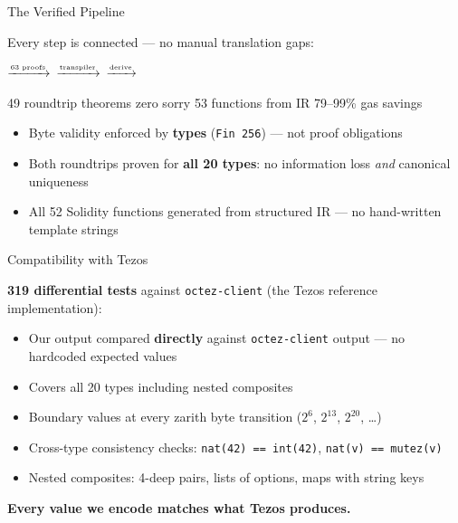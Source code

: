 \documentclass[aspectratio=169,10pt]{beamer}
\begin{document}
\begin{frame}{The Verified Pipeline}

Every step is connected --- no manual translation gaps:

\bigskip

\begin{center}
\small
\textcolor{tezosblue}{}
$\xrightarrow{\text{\tiny 63 proofs}}$
\textcolor{tezosblue}{}
$\xrightarrow{\text{\tiny transpiler}}$
\textcolor{evmpurple}{}
$\xrightarrow{\text{\tiny derive}}$
\textcolor{asmred}{}

\medskip
\scriptsize
\textcolor{tezosblue}{49 roundtrip theorems} \quad
\textcolor{tezosblue}{zero sorry} \quad
\textcolor{evmpurple}{53 functions from IR} \quad
\textcolor{asmred}{79--99\% gas savings}
\end{center}

\bigskip

\begin{itemize}
  \item Byte validity enforced by \textbf{types} (\texttt{Fin 256}) --- not proof obligations
  \item Both roundtrips proven for \textbf{all 20 types}: no information loss \emph{and} canonical uniqueness
  \item All 52 Solidity functions generated from structured IR --- no hand-written template strings
\end{itemize}
\end{frame}

\begin{frame}{Compatibility with Tezos}

\textbf{319 differential tests} against \texttt{octez-client} (the Tezos reference implementation):

\bigskip

\begin{itemize}
  \item Our output compared \textbf{directly} against \texttt{octez-client} output --- no hardcoded expected values
  \item Covers all 20 types including nested composites
  \item Boundary values at every zarith byte transition ($2^6$, $2^{13}$, $2^{20}$, \ldots)
  \item Cross-type consistency checks: \texttt{nat(42) == int(42)}, \texttt{nat(v) == mutez(v)}
  \item Nested composites: 4-deep pairs, lists of options, maps with string keys
\end{itemize}

\bigskip
\begin{center}
\textbf{Every value we encode matches what Tezos produces.}
\end{center}
\end{frame}
\end{document}
